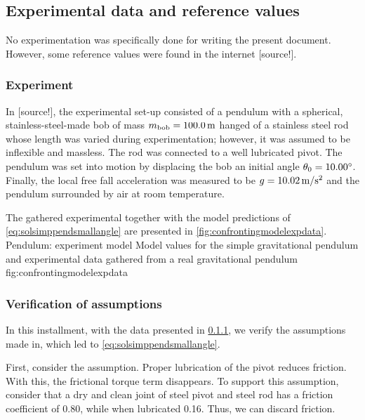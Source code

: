 \subsection{Experimental data and reference values}
No experimentation was specifically done for writing the present document. However, some reference values were found in the internet [source!]. 


\subsubsection{Experiment}\label{sec:experiment}
In [source!], the experimental set-up consisted of a pendulum with a spherical, stainless-steel-made bob of mass $m_\text{bob} = \SI{100.0}{m}$ hanged of a stainless steel rod whose length was varied during experimentation; however, it was assumed to be inflexible and massless. The rod was connected to a well lubricated pivot. The pendulum was set into motion by displacing the bob an initial angle $\theta_0 = \ang{10.00}$. Finally, the local free fall acceleration was measured to be $g = \SI{10.02}{m/s^2}$ and the pendulum surrounded by air at room temperature.

The gathered experimental together with the model predictions of \cref{eq:solsimppendsmallangle} are presented in \cref{fig:confrontingmodelexpdata}.
%
   {Pendulum: experiment \vs model}
   {Model values for the simple gravitational pendulum and experimental data gathered from a real gravitational pendulum}%
   {fig:confrontingmodelexpdata}%


\subsubsection{Verification of assumptions}
In this installment, with the data presented in \cref{sec:experiment}, we verify the assumptions made in, which led to \cref{eq:solsimppendsmallangle}.

First, consider the  assumption. Proper lubrication of the pivot reduces friction. With this, the frictional torque term disappears. To support this assumption, consider that a dry and clean joint of steel pivot and steel rod has a friction coefficient of 0.80, while when lubricated 0.16. Thus, we can discard friction.

